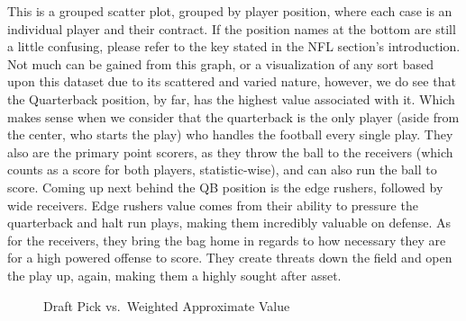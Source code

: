 \documentclass[
  letterpaper,
  DIV=11,
  numbers=noendperiod]{scrartcl}
\begin{document}
This is a grouped scatter plot, grouped by player position, where each
case is an individual player and their contract. If the position names
at the bottom are still a little confusing, please refer to the key
stated in the NFL section's introduction. Not much can be gained from
this graph, or a visualization of any sort based upon this dataset due
to its scattered and varied nature, however, we do see that the
Quarterback position, by far, has the highest value associated with it.
Which makes sense when we consider that the quarterback is the only
player (aside from the center, who starts the play) who handles the
football every single play. They also are the primary point scorers, as
they throw the ball to the receivers (which counts as a score for both
players, statistic-wise), and can also run the ball to score. Coming up
next behind the QB position is the edge rushers, followed by wide
receivers. Edge rushers value comes from their ability to pressure the
quarterback and halt run plays, making them incredibly valuable on
defense. As for the receivers, they bring the bag home in regards to how
necessary they are for a high powered offense to score. They create
threats down the field and open the play up, again, making them a highly
sought after asset.

\begin{figure}[H]


\caption{\label{fig-pick_vs_weighted_approx_value}Draft Pick
vs.~Weighted Approximate Value}

\end{figure}%
\end{document}
